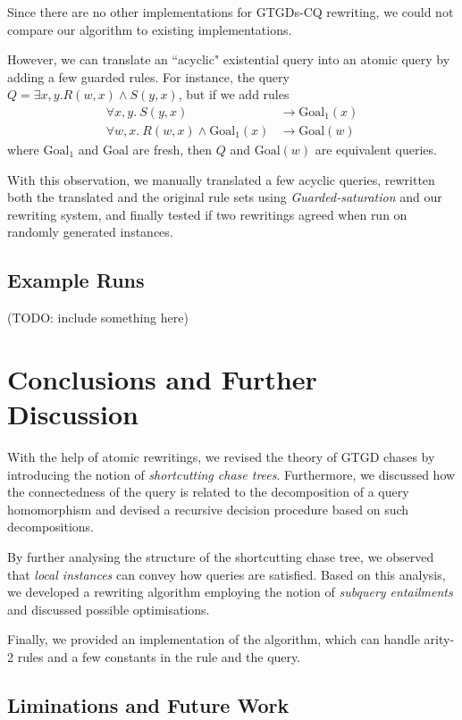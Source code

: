 \documentclass[12pt]{report}
\theoremstyle{plain}
\theoremstyle{definition}
\begin{document}
Since there are no other implementations for GTGDs-CQ rewriting, we could not compare our algorithm to existing implementations.

However, we can translate an ``acyclic" existential query into an atomic query by adding a few guarded rules. For instance, the query $Q = \exists x, y. R(w, x) \wedge S(y, x)$, but if we add rules \begin{align*}
  \forall x, y.\ S(y, x) &\rightarrow \mathrm{Goal}_1(x) \\
  \forall w, x.\ R(w, x) \wedge \mathrm{Goal}_1(x) &\rightarrow \mathrm{Goal}(w)
\end{align*}
where $\mathrm{Goal}_1$ and $\mathrm{Goal}$ are fresh, then $Q$ and $\mathrm{Goal}(w)$ are equivalent queries.

With this observation, we manually translated a few acyclic queries, rewritten both the translated and the original rule sets using \emph{Guarded-saturation} and our rewriting system, and finally tested if two rewritings agreed when run on randomly generated instances.

\section{Example Runs}
\label{section:example-runs}

(TODO: include something here)

\newpage
\chapter{Conclusions and Further Discussion}

With the help of atomic rewritings, we revised the theory of GTGD chases by introducing the notion of \emph{shortcutting chase trees}. Furthermore, we discussed how the connectedness of the query is related to the decomposition of a query homomorphism and devised a recursive decision procedure based on such decompositions.

By further analysing the structure of the shortcutting chase tree, we observed that \emph{local instances} can convey how queries are satisfied. Based on this analysis, we developed a rewriting algorithm employing the notion of \emph{subquery entailments} and discussed possible optimisations.

Finally, we provided an implementation of the algorithm, which can handle arity-2 rules and a few constants in the rule and the query.

\section{Liminations and Future Work}
\label{section:limitations-and-future-work}
\end{document}
